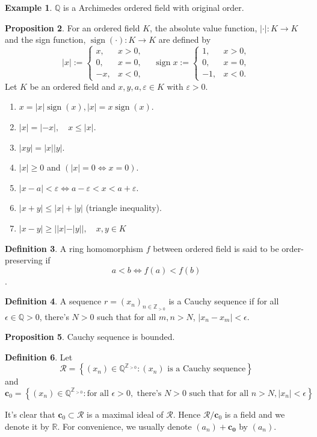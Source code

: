 \documentclass[12pt,a4paper]{book}
\newcommand{\bbrace}[1]{\left\{ #1 \right\} }
\newcommand{\bb}[1]{\mathbb{#1}}
\newenvironment{enu}{\begin{enumerate}[(1)]}{\end{enumerate}}
\theoremstyle{definition}
\newtheorem{defn}{Definition}[section]
\newtheorem{prop}[defn]{Proposition}
\newtheorem{exam}[defn]{Example}
\begin{document}
\begin{exam}
    $\bb{Q}$ is a Archimedes ordered field with original order.
\end{exam}
\begin{prop}
    For an ordered field $K$, the absolute value function, $|\cdot|: K \rightarrow K$ and the sign function, $\operatorname{sign}(\cdot): K \rightarrow K$ are defined by
    $$
        |x|:=\left\{\begin{array}{rl}
            x,  & x>0, \\
            0,  & x=0, \\
            -x, & x<0,
        \end{array} \quad \operatorname{sign} x:=\left\{\begin{aligned}
            1,  & x>0,  \\
            0,  & x=0,  \\
            -1, & x<0 .
        \end{aligned}\right.\right.
    $$
    Let $K$ be an ordered field and $x, y, a, \varepsilon \in K$ with $\varepsilon>0$.
    \begin{enu}
        \item $x=|x| \operatorname{sign}(x),|x|=x \operatorname{sign}(x)$.
        \item  $|x|=|-x|, \quad x \leq|x|$.
        \item  $|x y|=|x||y|$.
        \item $|x| \geq 0$ and $(|x|=0 \Leftrightarrow x=0)$.
        \item $|x-a|<\varepsilon \Leftrightarrow a-\varepsilon<x<a+\varepsilon$.
        \item  $|x+y| \leq|x|+|y|$ (triangle inequality).
        \item $|x-y| \geq|| x|-| y||, \quad x, y \in K$
    \end{enu}
\end{prop}
\begin{defn}
    A ring homomorphism $f$ between ordered field is said to be order-preserving if $$a<b\Longleftrightarrow  f(a)<f(b)$$.
\end{defn}
\begin{defn}
    A sequence $r=(x_n)_{n\in \bb{Z}_{>0}}$ is a Cauchy sequence if for all $\epsilon \in \bb{Q}>0$, there's $N>0$ such that for all $m,n>N$, $|x_n-x_m|<\epsilon$.
\end{defn}
\begin{prop}
    Cauchy sequence is bounded.
\end{prop}
\begin{defn}
    Let $$\mathcal{R}=\bbrace{(x_n)\in \bb{Q}^{\bb{Z}_{>0}}:(x_n) \text{ is a Cauchy sequence}}$$ and
    $$\mathbf{c}_0=\bbrace{(x_n)\in \bb{Q}^{\bb{Z}_{>0}}: \text{for all }\epsilon>0, \text{ there's } N>0 \text{ such that for all } n>N, |x_n|<\epsilon   }$$

    It's clear that $\mathbf{c}_0\subset \mathcal{R}$ is a maximal ideal of $\mathcal{R}$. Hence $\mathcal{R}/\mathbf{c}_0$ is a field and we denote it by $\bb{R}$. For convenience, we usually denote $(a_n)+\mathbf{c_0}$ by $(a_n)$.
\end{defn}
\end{document}
